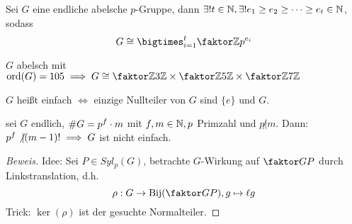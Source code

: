 \documentclass[a4paper]{report}
\begin{document}
\begin{satz} %
Sei $G$ eine endliche abelsche $p$-Gruppe, dann $\exists ! t \in \mathbb{N}, \exists! e_{1} \ge e_{2} \ge \cdots \ge e_{t} \in \mathbb{N}$, sodass
\[G \cong \bigtimes_{i=1}^{t}\fak{\Z}{p^{e_{i}}}\]
\end{satz}

\begin{bsp*}
$G$ abelsch mit $\ord(G) = 105 \imp G \cong \fak \Z {3\Z} \times \fak \Z {5\Z} \times \fak \Z {7\Z}$
\end{bsp*}

\begin{whg*}
$G$ heißt einfach $\iff $ einzige Nullteiler von $G$ sind $\{e\}$ und $G$.
\end{whg*}


\begin{lemm}[Übung] %
  sei $G$ endlich, $\# G = p^{f}\cdot  m$ mit $f, m \in \mathbb{N}, p$ Primzahl und $p \not | m$. Dann:
  $p^{f} \not |(m-1)! \implies G$ ist nicht einfach.
\begin{proof}[Beweis]
  Idee: Sei $P \in Syl_{p}(G)$, betrachte $G$-Wirkung auf $\fak GP$ durch Linkstranslation, d.h.
  \[\rho: G \to \Bij(\fak GP), g \mapsto \ell g\]
  Trick: $\ker(\rho)$ ist der gesuchte Normalteiler.
\end{proof}
\end{lemm}
\end{document}
